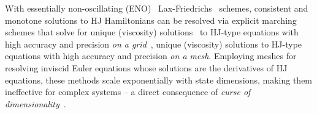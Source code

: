 With essentially non-oscillating (ENO)~\cite{OsherShuENO} Lax-Friedrichs~\cite{CrandallLaxFriedrichs} schemes, consistent and monotone solutions to HJ Hamiltonians can be resolved via explicit marching schemes that solve for unique (viscosity) solutions~\cite{Crandall1983viscosity, Crandall1984} to HJ-type equations with high accuracy and precision \textit{on a grid}~\cite{Crandall1984Approx, Sethian87Numerical, SethianLSBook},  unique (viscosity) solutions to HJ-type equations with high accuracy and precision \textit{on a mesh}. Employing meshes for resolving inviscid Euler equations whose solutions are the derivatives of HJ equations, these methods scale exponentially with state dimensions, making them ineffective for complex systems  -- a direct consequence of \textit{curse of dimensionality}~\cite{Bellman1957}. %

